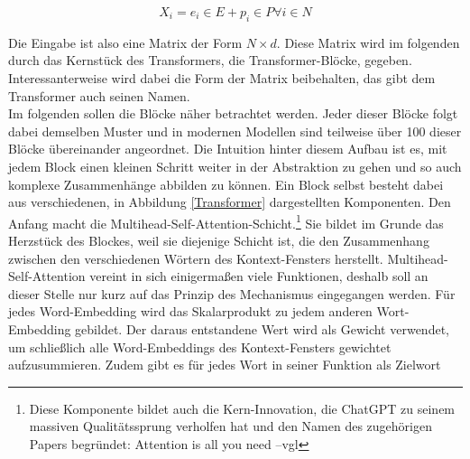 $$ X_i = e_i \in E + p_i \in P \forall i \in N$$

Die Eingabe ist also eine Matrix der Form $N \times d$. Diese Matrix wird im folgenden durch das Kernstück des Transformers, die Transformer-Blöcke, gegeben. Interessanterweise wird dabei die Form der Matrix beibehalten, das gibt dem Transformer auch seinen Namen.\\

Im folgenden sollen die Blöcke näher betrachtet werden. Jeder dieser Blöcke folgt dabei demselben Muster und in modernen Modellen sind teilweise über 100 dieser Blöcke übereinander angeordnet. Die Intuition hinter diesem Aufbau ist es, mit jedem Block einen kleinen Schritt weiter in der Abstraktion zu gehen und so auch komplexe Zusammenhänge abbilden zu können. 
Ein Block selbst besteht dabei aus verschiedenen, in Abbildung \ref{Transformer} dargestellten Komponenten. Den Anfang macht die Multihead-Self-Attention-Schicht.\footnote{Diese Komponente bildet auch die Kern-Innovation, die ChatGPT zu seinem massiven Qualitätssprung verholfen hat und den Namen des zugehörigen Papers begründet: Attention is all you need --vgl} Sie bildet im Grunde das Herzstück des Blockes, weil sie diejenige Schicht ist, die den Zusammenhang zwischen den verschiedenen Wörtern des Kontext-Fensters herstellt. Multihead-Self-Attention vereint in sich einigermaßen viele Funktionen, deshalb soll an dieser Stelle nur kurz auf das Prinzip des Mechanismus eingegangen werden. Für jedes Word-Embedding wird das Skalarprodukt zu jedem anderen Wort-Embedding gebildet. Der daraus entstandene Wert wird als Gewicht verwendet, um schließlich alle Word-Embeddings des Kontext-Fensters gewichtet aufzusummieren. Zudem gibt es für jedes Wort in seiner Funktion als Zielwort 


